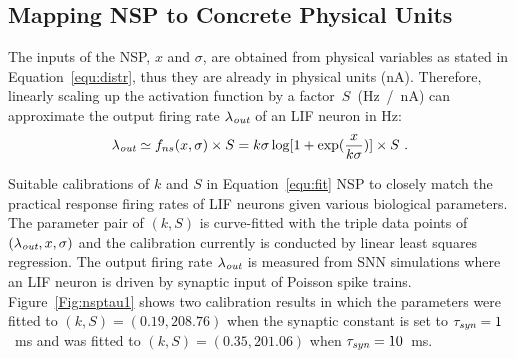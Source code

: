 
	\subsection{Mapping NSP to Concrete Physical Units}
	\label{sec:af_model}
	The inputs of the NSP, $x$ and $\sigma$, are obtained from physical variables as stated in Equation~\ref{equ:distr}, thus they are already in physical units (nA).
	Therefore, linearly scaling up the activation function by a factor~$S$~(Hz~/~nA) can approximate the output firing rate $\lambda_{\textit{\textrm{out}}}$ of an LIF neuron in Hz:
	\begin{equation}
	\lambda_{\textit{\textrm{out}}} \simeq f_{ns}(x, \sigma) \times S = k \sigma \log [1 + \exp(\frac{x}{k \sigma})] \times S~.
	\label{equ:fit}
	\end{equation}	

	
	Suitable calibrations of $k$ and $S$ in Equation~\ref{equ:fit} \DIFdelbegin {}\DIFdelend \DIFaddbegin {}\DIFaddend NSP to closely match the practical response firing rates of LIF neurons given various biological parameters.
	The parameter pair of $(k, S)$ is curve-fitted with the triple data points of $(\lambda_{\textit{\textrm{out}}}, x, \sigma)$ and the calibration currently is conducted by linear least squares regression.
	The output firing rate $\lambda_{\textit{\textrm{out}}}$ is measured from SNN simulations where an LIF neuron is driven by synaptic input \DIFdelbegin {}\DIFdelend \DIFaddbegin {}\DIFaddend of Poisson spike trains.
	Figure~\ref{Fig:nsptau1} shows two calibration results in which the parameters were fitted to $(k, S)=(0.19,208.76)$ when the synaptic constant is set to $\tau_{\textit{\textrm{syn}}}=1$~ms and was fitted to $(k, S)=(0.35,201.06)$ when $\tau_{\textit{\textrm{syn}}}=10$~ms.

